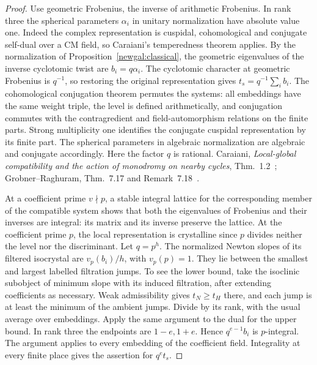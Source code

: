 \begin{proof}
Use geometric Frobenius, the inverse of arithmetic Frobenius. In rank
three the spherical parameters \(\alpha_i\) in unitary normalization
have absolute value one. Indeed the complex representation is cuspidal,
cohomological and conjugate self-dual over a CM field, so Caraiani's
temperedness theorem applies. By the normalization of
Proposition~\ref{newgal:classical}, the geometric eigenvalues of the
inverse cyclotomic twist are \(b_i=q\alpha_i\). The cyclotomic
character at geometric Frobenius is \(q^{-1}\), so restoring the
original representation gives \(t_s=q^{-1}\sum_i b_i\).
The cohomological conjugation theorem permutes the systems: all
embeddings have the same weight triple, the level is defined
arithmetically, and conjugation commutes with the contragredient and
field-automorphism relations on the finite parts. Strong multiplicity
one identifies the conjugate cuspidal representation by its finite
part. The spherical parameters in algebraic normalization are algebraic
and conjugate accordingly. Here the factor \(q\) is rational.
Caraiani,
\emph{Local-global compatibility and the action of monodromy on
nearby cycles}, Thm.~1.2~\cite{caraianiNearby};
Grobner--Raghuram,
Thm.~7.17 and Remark~7.18~\cite{grobnerRaghuram}.

At a coefficient prime \(v\nmid p\), a stable integral lattice for
the corresponding member of the compatible system shows that both the
eigenvalues of Frobenius and their inverses are integral: its matrix
and its inverse preserve the lattice. At the coefficient prime \(p\),
the local representation is crystalline since \(p\) divides neither
the level nor the discriminant. Let \(q=p^h\). The normalized Newton
slopes of its filtered isocrystal are \(v_p(b_i)/h\), with
\(v_p(p)=1\). They lie between the smallest and largest labelled
filtration jumps. To see the lower bound, take the isoclinic subobject
of minimum slope with its induced filtration, after extending
coefficients as necessary. Weak admissibility gives \(t_N\ge t_H\)
there, and each jump is at least the minimum of the ambient jumps.
Divide by its rank, with the usual average over embeddings. Apply the
same argument to the dual for the upper bound. In rank three the
endpoints are \(1-e,1+e\). Hence \(q^{e-1}b_i\) is \(p\)-integral.
The argument applies to every embedding of the coefficient field.
Integrality at every finite place gives the assertion for \(q^et_s\).


\end{proof}
